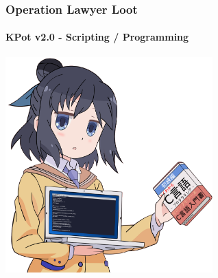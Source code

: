 \documentclass[aspectratio=169]{beamer}
\begin{document}
{
\begin{frame}
  \frametitle{Operation Lawyer Loot}
  \framesubtitle{KPot v2.0 - Scripting / Programming}
  \begin{center}
    \includegraphics[width=8cm]{anime-programming}
  \end{center}
\end{frame}
}
\end{document}
